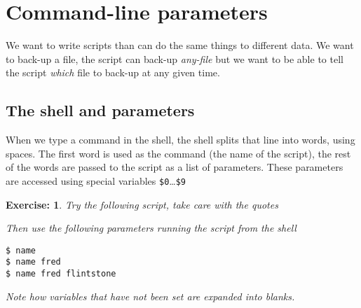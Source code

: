 \documentclass[12pt,a4paper]{article}
\newtheorem{exercise}{Exercise:}
\begin{document}


\section{Command-line parameters }
We want to write scripts than can do the same things to different data.  We
want to back-up a file, the script can back-up \emph{any-file} but we want to
be able to tell the script \emph{which} file to back-up at any given time.

\subsection{The shell and parameters}
When we type a command in the shell, the shell splits that line into words,
using spaces.  The first word is used as the command (the name of the script),
the rest of the words are passed to the script as a list of parameters.
These parameters are accessed using special variables
\texttt{\$0}\ldots\texttt{\$9}

\begin{exercise}
  Try the following script, take care with the quotes
  \begin{code}[title=name]
  
  \end{code}
Then use the following parameters running the script from the shell
\begin{terminal}
\begin{verbatim}
$ name
$ name fred
$ name fred flintstone
\end{verbatim}
\end{terminal}
Note how variables that have not been set are expanded into blanks.
\end{exercise}
\end{document}
